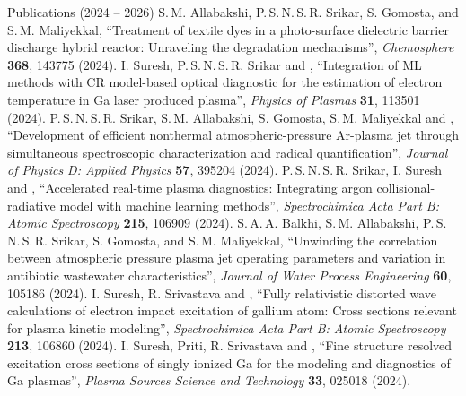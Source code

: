 \begin{rubric}{Publications (2024 -- 2026)}
\entry*[] \small S.\,M. Allabakshi, P.\,S.\,N.\,S.\,R. Srikar, S. Gomosta,  and S.\,M. Maliyekkal,
  ``Treatment of textile dyes in a photo-surface dielectric barrier discharge hybrid reactor: Unraveling the degradation mechanisms'',
  \emph{Chemosphere} \textbf{368}, 143775 (2024). 
\entry*[] \small I. Suresh, P.\,S.\,N.\,S.\,R. Srikar and ,
  ``Integration of ML methods with CR model-based optical diagnostic for the estimation of electron temperature in Ga laser produced plasma'',
  \emph{Physics of Plasmas} \textbf{31}, 113501 (2024). 
\entry*[] \small P.\,S.\,N.\,S.\,R. Srikar, S.\,M. Allabakshi, S. Gomosta, S.\,M. Maliyekkal and ,
  ``Development of efficient nonthermal atmospheric-pressure Ar-plasma jet through simultaneous spectroscopic characterization and radical quantification'',
  \emph{Journal of Physics D: Applied Physics} \textbf{57}, 395204 (2024). 
\entry*[] \small P.\,S.\,N.\,S.\,R. Srikar, I. Suresh and ,
  ``Accelerated real-time plasma diagnostics: Integrating argon collisional-radiative model with machine learning methods'',
  \emph{Spectrochimica Acta Part B: Atomic Spectroscopy} \textbf{215}, 106909 (2024). 
\entry*[] \small S.\,A.\,A. Balkhi, S.\,M. Allabakshi, P.\,S.\,N.\,S.\,R. Srikar, S. Gomosta,  and S.\,M. Maliyekkal,
  ``Unwinding the correlation between atmospheric pressure plasma jet operating parameters and variation in antibiotic wastewater characteristics'',
  \emph{Journal of Water Process Engineering} \textbf{60}, 105186 (2024). 
\entry*[] \small I. Suresh, R. Srivastava and ,
  ``Fully relativistic distorted wave calculations of electron impact excitation of gallium atom: Cross sections relevant for plasma kinetic modeling'',
  \emph{Spectrochimica Acta Part B: Atomic Spectroscopy} \textbf{213}, 106860 (2024). 
\entry*[] \small I. Suresh, Priti, R. Srivastava and ,
  ``Fine structure resolved excitation cross sections of singly ionized Ga for the modeling and diagnostics of Ga plasmas'',
  \emph{Plasma Sources Science and Technology} \textbf{33}, 025018 (2024). 


\end{rubric}
